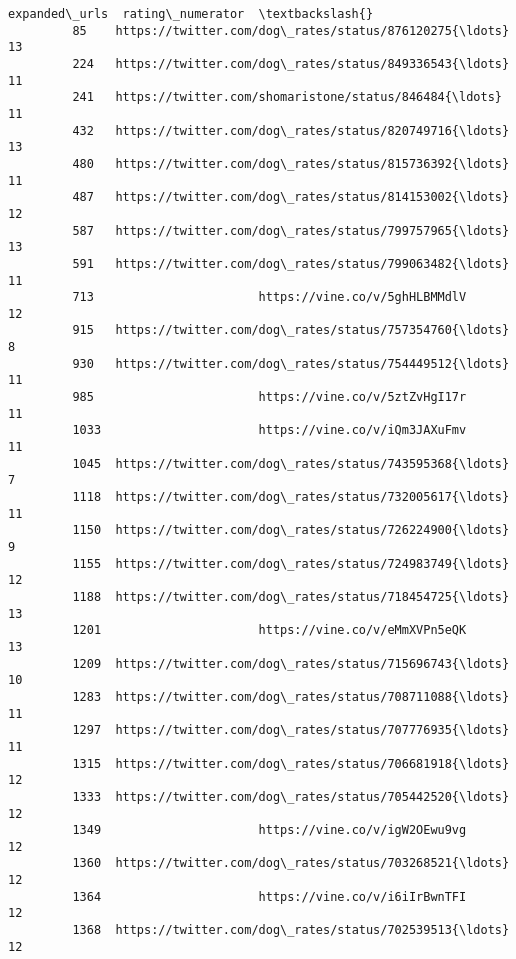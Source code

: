 \documentclass[11pt]{article}
\begin{document}
\begin{Verbatim}[commandchars=\\\{\}]
                                                   expanded\_urls  rating\_numerator  \textbackslash{}
         85    https://twitter.com/dog\_rates/status/876120275{\ldots}                13   
         224   https://twitter.com/dog\_rates/status/849336543{\ldots}                11   
         241   https://twitter.com/shomaristone/status/846484{\ldots}                11   
         432   https://twitter.com/dog\_rates/status/820749716{\ldots}                13   
         480   https://twitter.com/dog\_rates/status/815736392{\ldots}                11   
         487   https://twitter.com/dog\_rates/status/814153002{\ldots}                12   
         587   https://twitter.com/dog\_rates/status/799757965{\ldots}                13   
         591   https://twitter.com/dog\_rates/status/799063482{\ldots}                11   
         713                       https://vine.co/v/5ghHLBMMdlV                12   
         915   https://twitter.com/dog\_rates/status/757354760{\ldots}                 8   
         930   https://twitter.com/dog\_rates/status/754449512{\ldots}                11   
         985                       https://vine.co/v/5ztZvHgI17r                11   
         1033                      https://vine.co/v/iQm3JAXuFmv                11   
         1045  https://twitter.com/dog\_rates/status/743595368{\ldots}                 7   
         1118  https://twitter.com/dog\_rates/status/732005617{\ldots}                11   
         1150  https://twitter.com/dog\_rates/status/726224900{\ldots}                 9   
         1155  https://twitter.com/dog\_rates/status/724983749{\ldots}                12   
         1188  https://twitter.com/dog\_rates/status/718454725{\ldots}                13   
         1201                      https://vine.co/v/eMmXVPn5eQK                13   
         1209  https://twitter.com/dog\_rates/status/715696743{\ldots}                10   
         1283  https://twitter.com/dog\_rates/status/708711088{\ldots}                11   
         1297  https://twitter.com/dog\_rates/status/707776935{\ldots}                11   
         1315  https://twitter.com/dog\_rates/status/706681918{\ldots}                12   
         1333  https://twitter.com/dog\_rates/status/705442520{\ldots}                12   
         1349                      https://vine.co/v/igW2OEwu9vg                12   
         1360  https://twitter.com/dog\_rates/status/703268521{\ldots}                12   
         1364                      https://vine.co/v/i6iIrBwnTFI                12   
         1368  https://twitter.com/dog\_rates/status/702539513{\ldots}                12   

\end{Verbatim}
\end{document}
